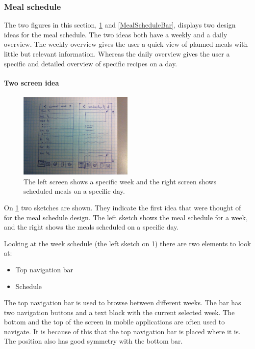 \subsubsection{Meal schedule}
The two figures in this section, \cref{MealScheduleList} and \cref{MealScheduleBar}, displays two design ideas for the meal schedule. The two ideas both have a weekly and a daily overview. The weekly overview gives the user a quick view of planned meals with little but relevant information. Whereas the daily overview gives the user a specific and detailed overview of specific recipes on a day.

\paragraph{Two screen idea} \label{FirstDraftWeekSchedule}

\begin{figure}[H]
	\centering
    \includegraphics[width=0.5\textwidth]{Grafik/FoodPlanner/FinalMealScheduleSketch1}
	\caption{The left screen shows a specific week and the right screen shows scheduled meals on a specific day.}
	\label{MealScheduleList}
\end{figure}

On \cref{MealScheduleList} two sketches are shown. They indicate the first idea that were thought of for the meal schedule design. The left sketch shows the meal schedule for a week, and the right shows the meals scheduled on a specific day.

Looking at the week schedule (the left sketch on \cref{MealScheduleList}) there are two elements to look at:

\begin{itemize}
    \item Top navigation bar
    \item Schedule
\end{itemize}

The top navigation bar is used to browse between different weeks. The bar has two navigation buttons and a text block with the current selected week. The bottom and the top of the screen in mobile applications are often used to navigate. It is because of this that the top navigation bar is placed where it is. The position also has good symmetry with the bottom bar.

